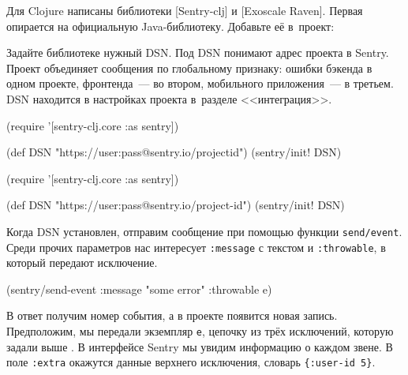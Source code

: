 Для Clojure написаны библиотеки
[Sentry-clj] и
[Exoscale Raven].
Первая опирается на официальную Java-библиотеку. Добавьте её в~проект:

\begin{english}
  \begin{clojure}
  \end{clojure}
\end{english}


Задайте библиотеке нужный DSN. Под DSN понимают адрес проекта в Sentry. Проект
объединяет сообщения по глобальному признаку: ошибки бэкенда в одном проекте,
фронтенда~--- во втором, мобильного приложения~--- в третьем. DSN находится в
настройках проекта в~разделе <<интеграция>>.

\ifnarrow

\begin{english}
  \begin{clojure}
(require '[sentry-clj.core :as sentry])

(def DSN
 "https://user:pass@sentry.io/projectid")
(sentry/init! DSN)
  \end{clojure}
\end{english}

\else

\begin{english}
  \begin{clojure}
(require '[sentry-clj.core :as sentry])

(def DSN "https://user:pass@sentry.io/project-id")
(sentry/init! DSN)
  \end{clojure}
\end{english}

\fi

Когда DSN установлен, отправим сообщение при помощью функции
\texttt{send\-/event}. Среди прочих параметров нас интересует \verb|:message| с
текстом и \verb|:throwable|, в который передают исключение.

\begin{english}
  \begin{clojure}
(sentry/send-event {:message "some error"
                    :throwable e})
  \end{clojure}
\end{english}

В ответ получим номер события, а в проекте появится новая запись. Предположим,
мы передали экземпляр \verb|e|, цепочку из трёх исключений, которую задали
выше . В интерфейсе Sentry мы увидим информацию о каждом звене. В
поле \verb|:extra| окажутся данные верхнего исключения, словарь
\verb|{:user-id 5}|.

